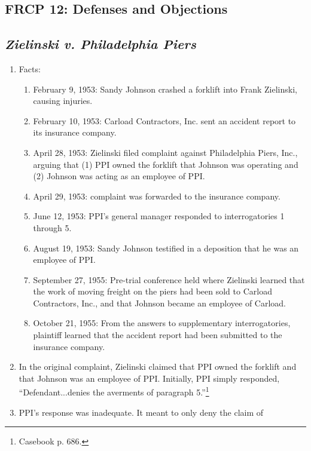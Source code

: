\subsection{FRCP 12: Defenses and Objections}

\subsection{\emph{Zielinski v. Philadelphia Piers}}

\begin{enumerate}
    \item Facts:
    \begin{enumerate}
        \item February 9, 1953: Sandy Johnson crashed a forklift into Frank 
        Zielinski, causing injuries.
        \item February 10, 1953: Carload Contractors, Inc. sent an accident 
        report to its insurance company.
        \item April 28, 1953: Zielinski filed complaint against Philadelphia 
        Piers, Inc., arguing that (1) PPI owned the forklift that Johnson was 
        operating and (2) Johnson was acting as an employee of PPI.
        \item April 29, 1953: complaint was forwarded to the insurance 
        company.
        \item June 12, 1953: PPI's general manager responded to 
        interrogatories 1 through 5.
        \item August 19, 1953: Sandy Johnson testified in a deposition that he 
        was an employee of PPI.
        \item September 27, 1955: Pre-trial conference held where Zielinski 
        learned that the work of moving freight on the piers had been sold to 
        Carload Contractors, Inc., and that Johnson became an employee of 
        Carload.
        \item October 21, 1955: From the answers to supplementary 
        interrogatories, plaintiff learned that the accident report had been 
        submitted to the insurance company.
    \end{enumerate}
    \item In the original complaint, Zielinski claimed that PPI owned the 
    forklift and that Johnson was an employee of PPI. Initially, PPI simply 
    responded, ``Defendant...denies the averments of paragraph 
    5.''\footnote{Casebook p. 686.}
    \item PPI's response was inadequate. It meant to only deny the claim of 

\end{enumerate}
